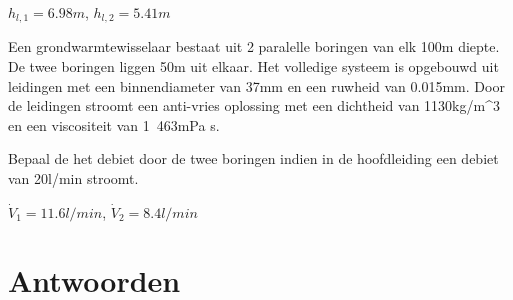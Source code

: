 \begin{antwoord}
	$h_{l,1} = \unit{6.98}{m}$, $h_{l,2} = \unit{5.41}{m}$
\end{antwoord}
\begin{toepassing*}
	\label{grondwarmtewisselaar}
Een grondwarmtewisselaar bestaat uit 2 paralelle boringen van elk 100m diepte. De twee boringen liggen 50m uit elkaar. Het volledige systeem is opgebouwd uit leidingen met een binnendiameter van 37mm en een ruwheid van 0.015mm. Door de leidingen stroomt een anti-vries oplossing met een dichtheid van \unit{1130}{kg/m^3} en een viscositeit van \unit{1.463}{mPa s}.
	
	Bepaal de het debiet door de twee boringen indien in de hoofdleiding een debiet van \unit{20}{l/min} stroomt.
	\begin{center}
		
	\end{center}
\end{toepassing*}
\begin{antwoord}
	$\dot{V}_{1} = \unit{11.6}{l/min}$, $\dot{V}_{2} = \unit{8.4}{l/min}$
\end{antwoord}
	\section*{Antwoorden}
\begin{multicols}{2}
\end{multicols}